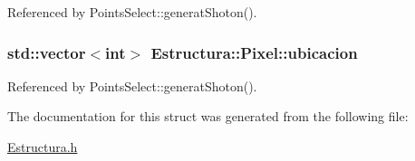 Referenced by Points\+Select\+::generat\+Shoton().

\subsubsection[{\texorpdfstring{ubicacion}{ubicacion}}]{\setlength{\rightskip}{0pt plus 5cm}std\+::vector$<$int$>$ Estructura\+::\+Pixel\+::ubicacion}\hypertarget{structEstructura_1_1Pixel_ac4b5e1358658d9f712933cb20a77d297}{}\label{structEstructura_1_1Pixel_ac4b5e1358658d9f712933cb20a77d297}


Referenced by Points\+Select\+::generat\+Shoton().



The documentation for this struct was generated from the following file\+:\begin{DoxyCompactItemize}
\item 
\hyperlink{Estructura_8h}{Estructura.\+h}\end{DoxyCompactItemize}
